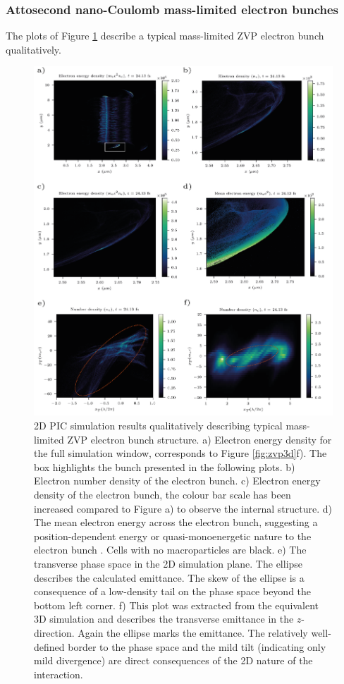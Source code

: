 \subsubsection{Attosecond nano-Coulomb mass-limited electron bunches}
The plots of Figure \ref{fig:zvptypicalbunch} describe a typical mass-limited ZVP electron bunch qualitatively.
\begin{figure}
	\centering
	\includegraphics[width=1\linewidth]{figures/zvp/zvp_typical_bunch}
	\caption[2D PIC simulation results qualitatively describing typical mass-limited ZVP electron bunch structure.]{2D PIC simulation results qualitatively describing typical mass-limited ZVP electron bunch structure. a) Electron energy density for the full simulation window, corresponds to Figure \ref{fig:zvp3d}f). The box highlights the bunch presented in the following plots. b) Electron number density of the electron bunch. c) Electron energy density of the electron bunch, the colour bar scale has been increased compared to Figure a) to observe the internal structure. d) The mean electron energy across the electron bunch, suggesting a position-dependent energy or quasi-monoenergetic nature to the electron bunch \cite{baevaZeroVectorPotential2011}. Cells with no macroparticles are black. e) The transverse phase space in the 2D simulation plane. The ellipse describes the calculated emittance. The skew of the ellipse is a consequence of a low-density tail on the phase space beyond the bottom left corner. f) This plot was extracted from the equivalent 3D simulation and describes the transverse emittance in the $z$-direction. Again the ellipse marks the emittance. The relatively well-defined border to the phase space and the mild tilt (indicating only mild divergence) are direct consequences of the 2D nature of the interaction.}
	\label{fig:zvptypicalbunch}
\end{figure}
